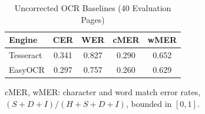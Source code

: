 \begin{table}[t]
\centering
\caption{Uncorrected OCR Baselines (40 Evaluation Pages)}
\label{tab:baseline}
\begin{tabular}{lcccc}
\toprule
Engine & CER & WER & cMER & wMER \\
\midrule
Tesseract & 0.341 & 0.827 & 0.290 & 0.652 \\
EasyOCR & 0.297 & 0.757 & 0.260 & 0.629 \\
\bottomrule
\end{tabular}
\par\smallskip
\begin{minipage}{\linewidth}\footnotesize cMER, wMER: character and word match error rates, $(S{+}D{+}I)/(H{+}S{+}D{+}I)$, bounded in $[0,1]$.\end{minipage}
\end{table}
